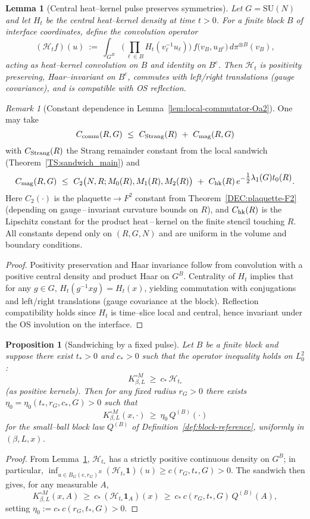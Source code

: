 \documentclass[11pt]{amsart}
\theoremstyle{plain}
\newtheorem{lemma}[theorem]{Lemma}
\newtheorem{proposition}[theorem]{Proposition}
\theoremstyle{definition}
\theoremstyle{remark}
\newtheorem{remark}[theorem]{Remark}
\renewcommand{\tfrac}[2]{\textstyle\frac{#1}{#2}}
\begin{document}
\begin{lemma}[Central heat--kernel pulse preserves symmetries]\label{lem:central-pulse}
Let $G=\mathrm{SU}(N)$ and let $H_t$ be the central heat--kernel density at time $t>0$. For a finite block $B$ of interface coordinates, define the convolution operator
\[
  (\mathcal H_t f)(u)\ :=\ \int_{G^{B}} \Big(\prod_{\ell\in B} H_t(v_\ell^{-1}u_\ell)\Big)\, f\big( v_B, u_{B^c}\big)\, d\pi^{\otimes B}(v_B),
\]
acting as heat--kernel convolution on $B$ and identity on $B^c$. Then $\mathcal H_t$ is positivity preserving, Haar--invariant on $B^c$, commutes with left/right translations (gauge covariance), and is compatible with OS reflection.
\end{lemma}
\begin{remark}[Constant dependence in Lemma~\ref{lem:local-commutator-Oa2}]
One may take
\[
  C_{\rm comm}(R,G)
  \ \le\ C_{\rm Strang}(R)\ +\ C_{\rm mag}(R,G)
\]
with $C_{\rm Strang}(R)$ the Strang remainder constant from the local sandwich (Theorem~\ref{TS:sandwich_main}) and
\[
  C_{\rm mag}(R,G)\ \le\ C_2\big(N,R;M_0(R),M_1(R),M_2(R)\big)\ +\ C_{\rm hk}(R)\,e^{-\tfrac12\lambda_1(G) t_0(R)}.
\]
Here $C_2(\cdot)$ is the plaquette$\to F^2$ constant from Theorem~\ref{DEC:plaquette-F2} (depending on gauge\,–\,invariant curvature bounds on $R$), and $C_{\rm hk}(R)$ is the Lipschitz constant for the product heat\,–\,kernel on the finite stencil touching $R$. All constants depend only on $(R,G,N)$ and are uniform in the volume and boundary conditions.
\end{remark}
\begin{proof}
Positivity preservation and Haar invariance follow from convolution with a positive central density and product Haar on $G^{B}$. Centrality of $H_t$ implies that for any $g\in G$, $H_t(g^{-1}xg)=H_t(x)$, yielding commutation with conjugations and left/right translations (gauge covariance at the block). Reflection compatibility holds since $H_t$ is time--slice local and central, hence invariant under the OS involution on the interface.
\end{proof}

\begin{proposition}[Sandwiching by a fixed pulse]\label{prop:sandwich-pulse}
Let $B$ be a finite block and suppose there exist $t_*>0$ and $c_*>0$ such that the operator inequality holds on $L^2_0$:
\[
  K_{\beta,L}^{\circ M}\ \ge\ c_*\, \mathcal H_{t_*}
\]
(as positive kernels). Then for any fixed radius $r_G>0$ there exists $\eta_0=\eta_0(t_*,r_G,c_*,G)>0$ such that
\[
  K_{\beta,L}^{\circ M}(x,\cdot)\ \ge\ \eta_0\, Q^{(B)}(\cdot)
\]
for the small--ball block law $Q^{(B)}$ of Definition~\ref{def:block-reference}, uniformly in $(\beta,L,x)$.
\end{proposition}
\begin{proof}
From Lemma~\ref{lem:central-pulse}, $\mathcal H_{t_*}$ has a strictly positive continuous density on $G^{B}$; in particular, $\inf_{u\in B_G(e,r_G)^{B}} (\mathcal H_{t_*}\mathbf 1)(u)\ge c(r_G,t_*,G)>0$. The sandwich then gives, for any measurable $A$,
\[
  K_{\beta,L}^{\circ M}(x,A)\ \ge\ c_*\, (\mathcal H_{t_*}\mathbf 1_{A})(x)\ \ge\ c_*\, c(r_G,t_*,G)\, Q^{(B)}(A),
\]
setting $\eta_0:=c_*\, c(r_G,t_*,G)>0$.
\end{proof}
\end{document}
